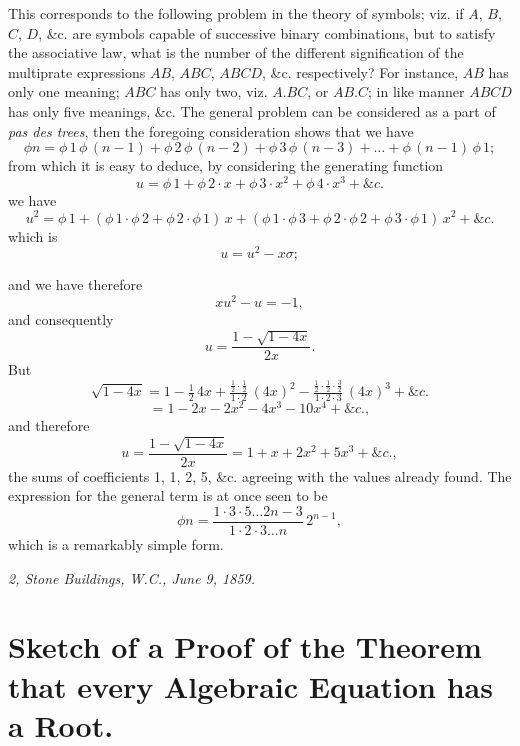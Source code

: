 \documentclass[11pt,a4paper]{book}
\begin{document}
\noindent
This corresponds to the following problem in the theory of symbols; viz. if $A$, $B$, $C$, $D$, \&c. are symbols capable of successive binary combinations, but to satisfy the associative law, what is the number of the different signification of the multiprate expressions $AB$, $ABC$, $ABCD$, \&c. respectively? For instance, $AB$ has only one meaning; $ABC$ has only two, viz. $A.BC$, or $AB.C$; in like manner $ABCD$ has only five meanings, &c. The general problem can be considered as a part of \textit{pas des trees}, then the foregoing consideration shows that we have
\[
\phi n = \phi\,1\,\phi\,(n-1) + \phi\,2\,\phi\,(n-2) + \phi\,3\,\phi\,(n-3) + \ldots + \phi\,(n-1)\,\phi\,1;
\]
from which it is easy to deduce, by considering the generating function
\[
u = \phi\,1 + \phi\,2 \cdot x + \phi\,3 \cdot x^2 + \phi\,4 \cdot x^3 + \&c.
\]
we have
\[
u^2 = \phi\,1 + (\phi\,1\cdot\phi\,2 + \phi\,2\cdot\phi\,1)\,x + (\phi\,1\cdot\phi\,3 + \phi\,2\cdot\phi\,2 + \phi\,3\cdot\phi\,1)\,x^2 + \&c.
\]
which is
\[
u = u^2 - x\sigma;
\]

\setcounter{page}{115}

and we have therefore
\[
xu^2 - u = -1,
\]
and consequently
\[
u = \frac{1-\sqrt{1-4x}}{2x}.
\]
But
\[
\sqrt{1-4x} = 1 - \tfrac{1}{2}\,4x + \tfrac{\frac{1}{2}\cdot \frac{1}{2}}{1\cdot 2}\,(4x)^2 - \tfrac{\frac{1}{2}\cdot \frac{1}{2}\cdot \frac{3}{2}}{1\cdot 2\cdot 3}\,(4x)^3 + \&c.
\]
\[
= 1 - 2x - 2x^2 - 4x^3 - 10x^4 + \&c.,
\]
and therefore
\[
u = \frac{1 - \sqrt{1-4x}}{2x} = 1 + x + 2x^2 + 5x^3 + \&c.,
\]
the sums of coefficients 1, 1, 2, 5, \&c. agreeing with the values already found. The expression for the general term is at once seen to be
\[
\phi n = \frac{1\cdot 3\cdot 5 \ldots 2n-3}{1\cdot 2\cdot 3 \ldots n}\,2^{n-1},
\]
which is a remarkably simple form.

\smallskip
\noindent\textit{2, Stone Buildings, W.C., June 9, 1859.}

\newpage


\setcounter{page}{116}

\section*{Sketch of a Proof of the Theorem that every Algebraic Equation has a Root.}
\label{paper:248}
\end{document}
